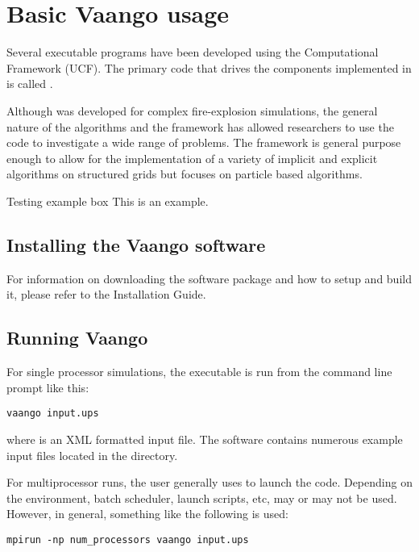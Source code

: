 \chapter{Basic Vaango usage} \label{Chapter:UCF}
Several executable programs have been developed using the \Vaango
Computational Framework (UCF).  The primary code that drives the
components implemented in \Vaango is called .

Although \Uintah was developed for complex fire-explosion simulations,
the general nature of the algorithms and the framework has allowed 
researchers to use the code to investigate a
wide range of problems.  The \Vaango framework is general purpose enough to
allow for the implementation of a variety of implicit and explicit
algorithms on structured grids but focuses on particle based
algorithms.

\begin{ExampleBox}{Testing example box}
  This is an example.
\end{ExampleBox}

\section{Installing the Vaango software}
For information on downloading the \Vaango software package 
and how to setup and build it, please refer to the \Vaango Installation Guide.

\section{Running Vaango}
For single processor simulations, the  executable
is run from the command line prompt like this:
\begin{lstlisting}[backgroundcolor=\color{background}]
  vaango input.ups
\end{lstlisting}
where  is an XML formatted input file.  The
\Vaango software contains numerous example input files located
in the  directory.

For multiprocessor runs, the user generally uses 
to launch the code.  Depending on the environment, batch
scheduler, launch scripts, etc,  may or may not
be used.  However, in general, something like the following is used:
\begin{lstlisting}[backgroundcolor=\color{background}]
  mpirun -np num_processors vaango input.ups
\end{lstlisting}

